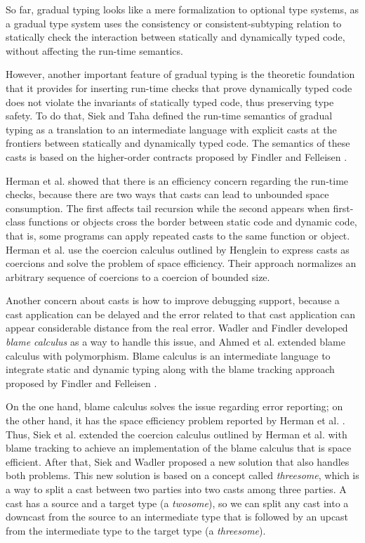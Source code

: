 So far, gradual typing looks like a mere formalization to optional
type systems, as a gradual type system uses the consistency or
consistent-subtyping relation to statically check the interaction
between statically and dynamically typed code, without affecting
the run-time semantics.

However, another important feature of gradual typing is the theoretic
foundation that it provides for inserting run-time checks that
prove dynamically typed code does not violate the invariants of
statically typed code, thus preserving type safety.
To do that, Siek and Taha \cite{siek2006gradual,siek2007objects}
defined the run-time semantics of gradual typing as a translation to an
intermediate language with explicit casts at the frontiers between
statically and dynamically typed code.
The semantics of these casts is based on the higher-order contracts
proposed by Findler and Felleisen \cite{findler2002chf}.

Herman et al. \cite{herman2007sgt} showed that there is an
efficiency concern regarding the run-time checks, because there are
two ways that casts can lead to unbounded space consumption.
The first affects tail recursion while the second appears when
first-class functions or objects cross the border between
static code and dynamic code, that is, some programs can apply
repeated casts to the same function or object.
Herman et al. \cite{herman2007sgt} use the coercion calculus
outlined by Henglein \cite{henglein1994dts} to express casts
as coercions and solve the problem of space efficiency.
Their approach normalizes an arbitrary sequence of coercions to a
coercion of bounded size.

Another concern about casts is how to improve debugging support,
because a cast application can be delayed and the error related
to that cast application can appear considerable distance
from the real error.
Wadler and Findler \cite{wadler2009wpc} developed \emph{blame calculus}
as a way to handle this issue, and Ahmed et al. \cite{ahmed2011bfa}
extended blame calculus with polymorphism.
Blame calculus is an intermediate language to integrate
static and dynamic typing along with the blame tracking approach
proposed by Findler and Felleisen \cite{findler2002chf}.

On the one hand, blame calculus solves the issue regarding
error reporting;
on the other hand, it has the space efficiency problem reported
by Herman et al. \cite{herman2007sgt}.
Thus, Siek et al. \cite{siek2009casts} extended the coercion
calculus outlined by Herman et al. \cite{herman2007sgt} with
blame tracking to achieve an implementation of the blame calculus that
is space efficient.
After that, Siek and Wadler \cite{siek2010blame} proposed a new solution
that also handles both problems.
This new solution is based on a concept called \emph{threesome},
which is a way to split a cast between two parties into two casts
among three parties.
A cast has a source and a target type (a \emph{twosome}),
so we can split any cast into a downcast from the source to an
intermediate type that is followed by an upcast from the intermediate
type to the target type (a \emph{threesome}).

